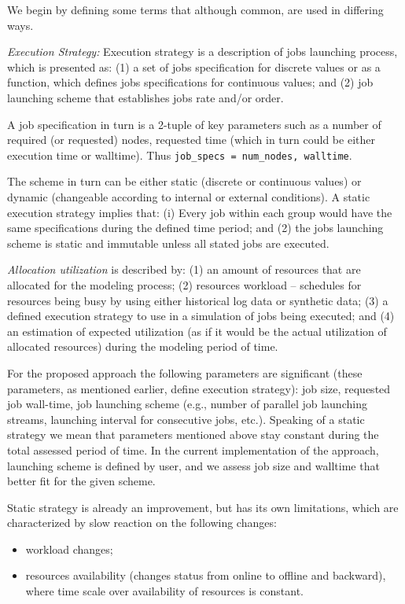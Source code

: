 
We begin by defining some terms that although common, are used in differing
ways. 

\textit{Execution Strategy:} Execution strategy is a description of jobs
launching process, which is presented as: (1) a set of jobs specification for
discrete values or as a function, which defines jobs specifications for
continuous values; and (2) job launching scheme that establishes jobs rate
and/or order.

A job specification in turn is a 2-tuple of key parameters such as a number of
required (or requested) nodes, requested time (which in turn could be either
execution time or walltime). Thus \texttt{job_specs = {num_nodes, walltime}}.

The scheme in turn can be either static (discrete or continuous values) or
dynamic (changeable according to internal or external conditions). A static
execution strategy implies that: (i) Every job within each group would have
the same specifications during the defined time period; and (2) the jobs
launching scheme is static and immutable unless all stated jobs are executed.

\textit{Allocation utilization} is described by: (1) an amount of resources
that are allocated for the modeling process; (2) resources workload --
schedules for resources being busy by using either historical log data or
synthetic data; (3) a defined execution strategy to use in a simulation of
jobs being executed; and (4) an estimation of expected utilization (as if it
would be the actual utilization of allocated resources) during the modeling
period of time.

For the proposed approach the following parameters are significant (these
parameters, as mentioned earlier, define execution strategy): job size,
requested job wall-time, job launching scheme (e.g., number of parallel job
launching streams, launching interval for consecutive jobs, etc.). Speaking
of a static strategy we mean that parameters mentioned above stay constant
during the total assessed period of time. In the current implementation of
the approach, launching scheme is defined by user, and we assess job size
and walltime that better fit for the given scheme.

Static strategy is already an improvement, but has its own limitations,
which are characterized by slow reaction on the following changes:
\begin{itemize}
    \item workload changes;
    \item resources availability (changes status from online to offline and
    backward), where time scale over availability of resources is constant.
\end{itemize}


